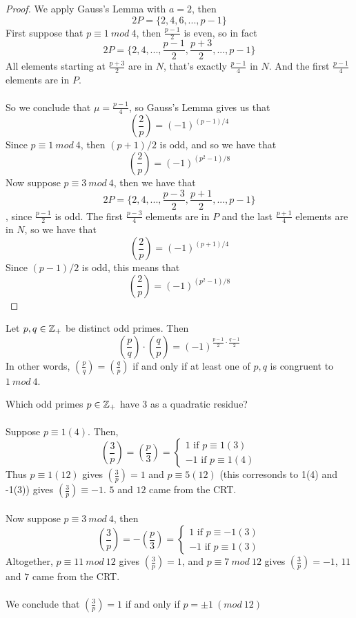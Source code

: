 \begin{proof}
We apply Gauss's Lemma with $a = 2$, then
\[2P = \{2, 4, 6, ..., p - 1\}\]
First suppose that $p \equiv 1\ mod\ 4$, then $\frac{p-1}{2}$ is even, so in fact
\[2P = \{2, 4, ..., \frac{p-1}{2}, \frac{p+3}{2}, ..., p -1\}\]
All elements starting at $\frac{p+3}{2}$ are in $N$, that's exactly $\frac{p-1}{4}$ in $N$. And the first $\frac{p-1}{4}$ elements are in $P$.\\\\
So we conclude that $\mu = \frac{p-1}{4}$, so Gauss's Lemma gives us that
\[(\frac{2}{p}) = (-1)^{(p-1)/4}\]
Since $p \equiv 1\ mod\ 4$, then $(p+1)/2$ is odd, and so we have that
\[(\frac{2}{p}) = (-1)^{(p^2-1)/8}\]
Now suppose $p \equiv 3\ mod\ 4$, then we have that
\[2P = \{2, 4, ..., \frac{p-3}{2}, \frac{p+1}{2}, ..., p-1\}\]
, since $\frac{p-1}{2}$ is odd. The first $\frac{p-3}{4}$ elements are in $P$ and the last $\frac{p+1}{4}$ elements are in $N$, so we have that
\[(\frac{2}{p}) = (-1)^{(p+1)/4}\]
Since $(p-1)/2$ is odd, this means that
\[(\frac{2}{p}) = (-1)^{(p^2-1)/8}\]
\end{proof}

\begin{theorem}
Let $p, q \in \mathbb{Z}_+$ be distinct odd primes. Then 
\[(\frac{p}{q}) \cdot (\frac{q}{p}) = (-1)^{\frac{p-1}{2} \cdot \frac{q-1}{2}}\]
In other words, $(\frac{p}{q}) = (\frac{q}{p})$ if and only if at least one of $p, q$ is congruent to $1\ mod\ 4$.
\end{theorem}

\begin{example}
Which odd primes $p \in \mathbb{Z}_+$ have $3$ as a quadratic residue?\\\\
Suppose $p \equiv 1(4)$. Then,
\[(\frac{3}{p}) = (\frac{p}{3}) = \begin{cases}
1 \text{ if $p \equiv 1(3)$}\\
-1 \text{ if $p \equiv 1(4)$}
\end{cases}\]
Thus $p \equiv 1(12)$ gives $(\frac{3}{p}) = 1$ and $p \equiv 5(12)$ (this corresonds to 1(4) and -1(3)) gives $(\frac{3}{p}) \equiv -1$. $5$ and $12$ came from the CRT.\\\\
Now suppose $p \equiv 3\ mod\ 4$, then
\[(\frac{3}{p}) = -(\frac{p}{3}) = \begin{cases}
1 \text{ if $p \equiv -1(3)$}\\
-1 \text{ if $p \equiv 1(3)$}
\end{cases}\]
Altogether, $p \equiv 11\ mod\ 12$ gives $(\frac{3}{p}) = 1$, and $p \equiv 7\ mod\ 12$ gives $(\frac{3}{p}) = -1$, $11$ and $7$ came from the CRT.\\\\
We conclude that $(\frac{3}{p}) = 1$ if and only if $p = \pm 1\ (mod\ 12)$
\end{example}